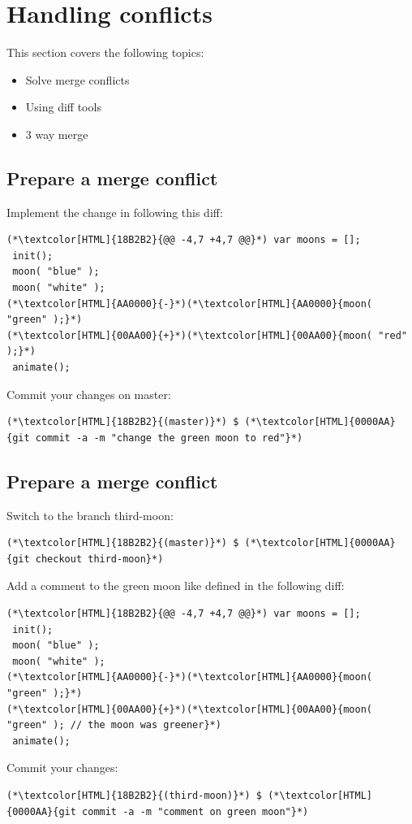 \section{Handling conflicts}
\begin{frame}[fragile]
  \slidetitle
  This section covers the following topics:
  \begin{itemize}
    \item Solve merge conflicts
    \item Using diff tools
    \item 3 way merge
  \end{itemize}
\end{frame}

\subsection{Prepare a merge conflict}
\begin{frame}[fragile]
  \subslidetitle
  Implement the change in  following this diff:
  \begin{lstlisting}
(*\textcolor[HTML]{18B2B2}{@@ -4,7 +4,7 @@}*) var moons = [];
 init();
 moon( "blue" );
 moon( "white" );
(*\textcolor[HTML]{AA0000}{-}*)(*\textcolor[HTML]{AA0000}{moon( "green" );}*)
(*\textcolor[HTML]{00AA00}{+}*)(*\textcolor[HTML]{00AA00}{moon( "red" );}*)
 animate();
\end{lstlisting}

  Commit your changes on master:
  \begin{lstlisting}
(*\textcolor[HTML]{18B2B2}{(master)}*) $ (*\textcolor[HTML]{0000AA}{git commit -a -m "change the green moon to red"}*)
\end{lstlisting}

\end{frame}

\subsection{Prepare a merge conflict}
\begin{frame}[fragile]
  \subslidetitle

  Switch to the branch third-moon:
  \begin{lstlisting}
(*\textcolor[HTML]{18B2B2}{(master)}*) $ (*\textcolor[HTML]{0000AA}{git checkout third-moon}*)
\end{lstlisting}

  Add a comment to the green moon like defined in the following diff:
  \begin{lstlisting}
(*\textcolor[HTML]{18B2B2}{@@ -4,7 +4,7 @@}*) var moons = [];
 init();
 moon( "blue" );
 moon( "white" );
(*\textcolor[HTML]{AA0000}{-}*)(*\textcolor[HTML]{AA0000}{moon( "green" );}*)
(*\textcolor[HTML]{00AA00}{+}*)(*\textcolor[HTML]{00AA00}{moon( "green" ); // the moon was greener}*)
 animate();
\end{lstlisting}

  Commit your changes:
  \begin{lstlisting}
(*\textcolor[HTML]{18B2B2}{(third-moon)}*) $ (*\textcolor[HTML]{0000AA}{git commit -a -m "comment on green moon"}*)
\end{lstlisting}
\end{frame}

